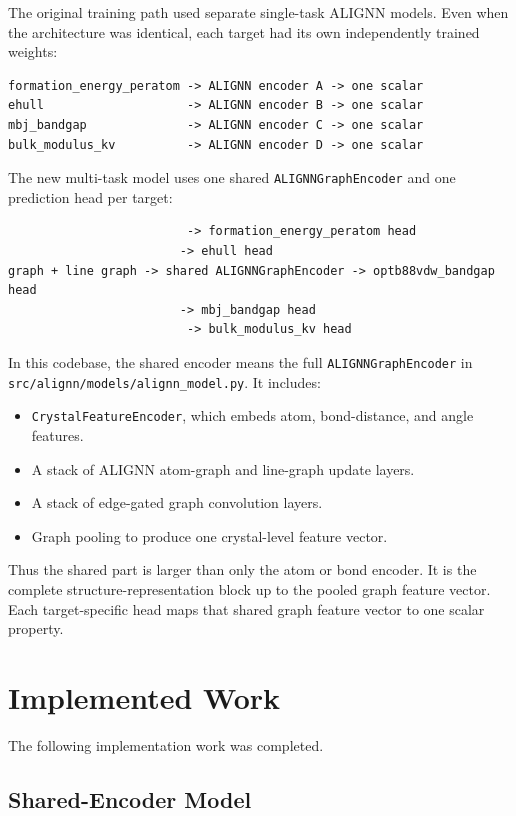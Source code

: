\documentclass[11pt,a4paper]{article}
\begin{document}
The original training path used separate single-task ALIGNN models.  Even when the architecture was identical, each target had its own independently trained weights:

\begin{verbatim}
formation_energy_peratom -> ALIGNN encoder A -> one scalar
ehull                    -> ALIGNN encoder B -> one scalar
mbj_bandgap              -> ALIGNN encoder C -> one scalar
bulk_modulus_kv          -> ALIGNN encoder D -> one scalar
\end{verbatim}

The new multi-task model uses one shared \texttt{ALIGNNGraphEncoder} and one prediction head per target:

\begin{verbatim}
                         -> formation_energy_peratom head
                        -> ehull head
graph + line graph -> shared ALIGNNGraphEncoder -> optb88vdw_bandgap head
                        -> mbj_bandgap head
                         -> bulk_modulus_kv head
\end{verbatim}

In this codebase, the shared encoder means the full \texttt{ALIGNNGraphEncoder} in \texttt{src/alignn/models/alignn\_model.py}.  It includes:

\begin{itemize}
  \item \texttt{CrystalFeatureEncoder}, which embeds atom, bond-distance, and angle features.
  \item A stack of ALIGNN atom-graph and line-graph update layers.
  \item A stack of edge-gated graph convolution layers.
  \item Graph pooling to produce one crystal-level feature vector.
\end{itemize}

Thus the shared part is larger than only the atom or bond encoder.  It is the complete structure-representation block up to the pooled graph feature vector.  Each target-specific head maps that shared graph feature vector to one scalar property.

\section{Implemented Work}

The following implementation work was completed.

\subsection{Shared-Encoder Model}
\end{document}
